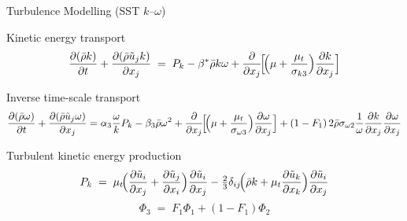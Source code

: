\documentclass[10pt,aspectratio=43]{beamer}
\newcommand{\pd}[2]{\frac{\partial #1}{\partial #2}}
\begin{document}
\begin{frame}{Turbulence Modelling (SST $k$--$\omega$)}
  \scriptsize
  \begin{block}{Kinetic energy transport}
    \[
      \pd{(\bar{\rho} k)}{t} + \pd{(\bar{\rho}\tilde{u}_{j} k)}{x_{j}}
        \;=\; P_{k} - \beta^{*}\bar{\rho}k\omega
              + \pd{}{x_{j}}\!\Bigl[\!\Bigl(\mu+\frac{\mu_{t}}{\sigma_{k3}}\Bigr)\pd{k}{x_{j}}\Bigr]
    \]
  \end{block}
  \begin{block}{Inverse time-scale transport}
    \[
      \pd{(\bar{\rho}\omega)}{t} + \pd{(\bar{\rho}\tilde{u}_{j}\omega)}{x_{j}}
        = \alpha_{3}\frac{\omega}{k}P_{k} - \beta_{3}\bar{\rho}\omega^{2}
              + \pd{}{x_{j}}\!\Bigl[\!\Bigl(\mu+\frac{\mu_{t}}{\sigma_{\omega3}}\Bigr)\pd{\omega}{x_{j}}\Bigr]
              + (1-F_{1})\,2\bar{\rho}\sigma_{\omega2}\frac{1}{\omega}\pd{k}{x_{j}}\pd{\omega}{x_{j}}
    \]
  \end{block}
  \begin{block}{Turbulent kinetic energy production}
    \[
      P_{k} \;=\; \mu_{t}\!\Bigl(\pd{\tilde{u}_{i}}{x_{j}}+\pd{\tilde{u}_{j}}{x_{i}}\Bigr)\pd{\tilde{u}_{i}}{x_{j}}
              - \tfrac{2}{3}\delta_{ij}\!\Bigl(\bar{\rho}k+\mu_{t}\pd{\tilde{u}_{k}}{x_{k}}\Bigr)\pd{\tilde{u}_{i}}{x_{j}}
    \]
    \[
      \Phi_{3} \;=\; F_{1}\Phi_{1} + (1-F_{1})\Phi_{2}
    \]
  \end{block}
\end{frame}
\end{document}

